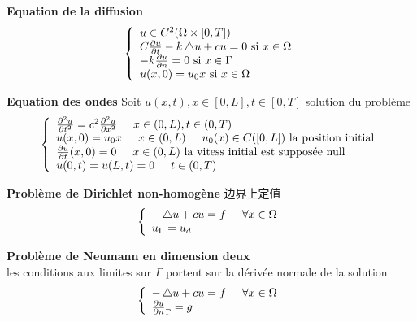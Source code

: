 \documentclass[openany]{book}
\begin{document}
\textbf{Equation de la diffusion}
\begin{equation}
\left\{
  \begin{array}{ll}
		  u \in C^2(\Omega \times [0,T]) \\
		  C \frac{\partial  u}{\partial t} - k \mathop{}\!\mathbin\bigtriangleup u + cu =0 \textrm{ si } x \in \Omega \\
		  -k \frac{\partial u}{\partial n} = 0 \textrm{ si } x \in \Gamma \\
		  u(x,0) = u_0{x} \textrm{ si } x \in \Omega\\
  \end{array}
\right.
\end{equation}
\bigskip

\textbf{Equation des ondes}
Soit $u(x,t), x \in [0,L], t \in [0,T] $ solution du probl\`eme
\begin{equation}
\left\{
  \begin{array}{ll}
		  \frac{\partial^2  u}{\partial t^2} = c^2 \frac{\partial^2 u}{\partial x^2 } \eqspace  x \in (0,L), t \in (0,T) \\
		  u(x,0) = u_0{x} \eqspace x \in (0,L) \eqspace u_0(x)\in C([0,L])\  \text{la position initial}\\
		  \frac{\partial  u}{\partial t}(x,0) = 0 \eqspace x \in (0,L)\ \text{la vitess initial est suppos\'ee null}\\
		  u(0,t) = u(L,t) = 0 \eqspace t \in (0,T)
  \end{array}
\right.
\end{equation}
\bigskip

\textbf{Probl\`eme de Dirichlet non-homog\`ene}
边界上定值\\
\begin{equation}
\left\{
  \begin{array}{ll}
		 -\mathop{}\!\mathbin\bigtriangleup u + cu = f \hspace{0.5cm} \forall x \in \Omega \\
		 u_{\Gamma} = u_d
  \end{array}
\right.
\end{equation}
\bigskip

\textbf{Probl\`eme de Neumann en dimension deux}\\
les conditions aux limites sur $\Gamma$ portent sur la d\'eriv\'ee normale de la solution\\
\begin{equation}
\left\{
  \begin{array}{ll}
		 -\mathop{}\!\mathbin\bigtriangleup u + cu = f \hspace{0.5cm} \forall x \in \Omega \\
		 \frac{\partial u}{\partial n}_{\Gamma} = g
  \end{array}
\right.
\end{equation}
\bigskip
\end{document}
